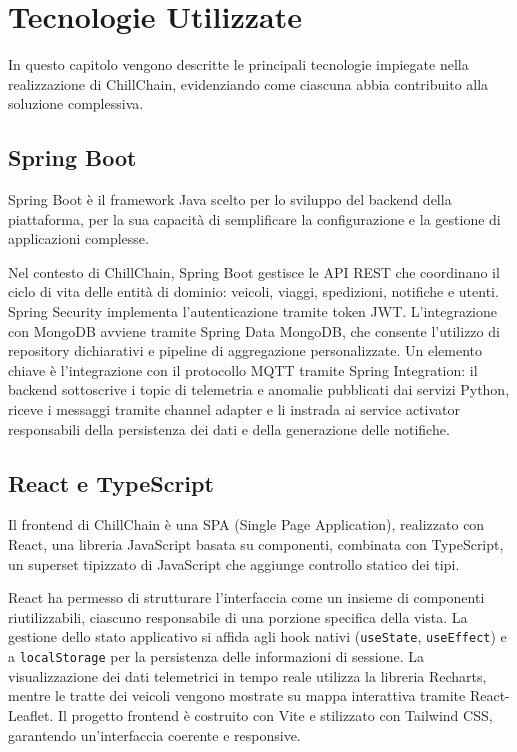 \chapter{Tecnologie Utilizzate}
\label{ch:tecnologie}

In questo capitolo vengono descritte le principali tecnologie impiegate nella realizzazione di ChillChain, evidenziando come ciascuna abbia contribuito alla soluzione complessiva.

\section{Spring Boot}

Spring Boot è il framework Java scelto per lo sviluppo del backend della piattaforma, per la sua capacità di semplificare la configurazione e la gestione di applicazioni complesse.

Nel contesto di ChillChain, Spring Boot gestisce le API REST che coordinano il ciclo di vita delle entità di dominio: veicoli, viaggi, spedizioni, notifiche e utenti. Spring Security implementa l'autenticazione tramite token JWT. L'integrazione con MongoDB avviene tramite Spring Data MongoDB, che consente l'utilizzo di repository dichiarativi e pipeline di aggregazione personalizzate. 
Un elemento chiave è l’integrazione con il protocollo MQTT tramite Spring Integration: il backend sottoscrive i topic di telemetria e anomalie pubblicati dai servizi Python, riceve i messaggi tramite channel adapter e li instrada ai service activator responsabili della persistenza dei dati e della generazione delle notifiche.

\section{React e TypeScript}

Il frontend di ChillChain è una SPA (Single Page Application), realizzato con React, una libreria JavaScript basata su componenti, combinata con TypeScript, un superset tipizzato di JavaScript che aggiunge controllo statico dei tipi.

React ha permesso di strutturare l'interfaccia come un insieme di componenti riutilizzabili, ciascuno responsabile di una porzione specifica della vista. La gestione dello stato applicativo si affida agli hook nativi (\texttt{useState}, \texttt{useEffect}) e a \texttt{localStorage} per la persistenza delle informazioni di sessione. La visualizzazione dei dati telemetrici in tempo reale utilizza la libreria Recharts, mentre le tratte dei veicoli vengono mostrate su mappa interattiva tramite React-Leaflet. Il progetto frontend è costruito con Vite e stilizzato con Tailwind CSS, garantendo un’interfaccia coerente e responsive.

